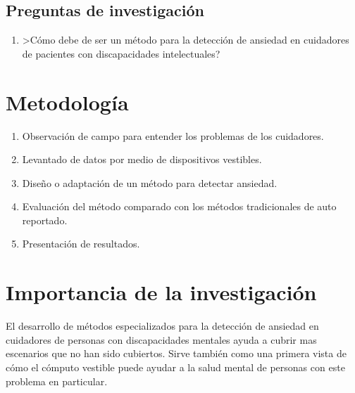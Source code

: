 \documentclass[letterpaper,12pt]{cicese}
\begin{document}
			\section{Preguntas de investigaci\'on}
				\begin{enumerate}
					\item >C\'omo debe de ser un m\'etodo para la detecci\'on de ansiedad en cuidadores de pacientes con discapacidades intelectuales? 
				\end{enumerate}
		\chapter{Metodolog\'ia}
				\begin{enumerate}
					\item Observaci\'on de campo para entender los problemas de los cuidadores.
					\item Levantado de datos por medio de dispositivos vestibles.
					\item Dise\~no o adaptaci\'on de un m\'etodo para detectar ansiedad.
					\item Evaluaci\'on del m\'etodo comparado con los m\'etodos tradicionales de auto reportado.
					\item Presentaci\'on de resultados.
				\end{enumerate}
		\chapter{Importancia de la investigaci\'on}
				El desarrollo de m\'etodos especializados para la detecci\'on de ansiedad en cuidadores de personas con discapacidades mentales ayuda a cubrir mas escenarios que no han sido cubiertos. Sirve tambi\'en como una primera vista de c\'omo el c\'omputo vestible puede ayudar a la salud mental de  personas con este problema en particular.
\end{document}
